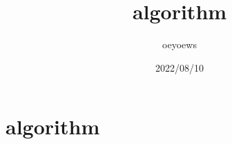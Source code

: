 \documentclass{article}
\title{algorithm}
\author{oeyoews}
\date{2022/08/10}
\begin{document}
\maketitle


\section{algorithm}%
\label{sec:algorithm}
\end{document}
